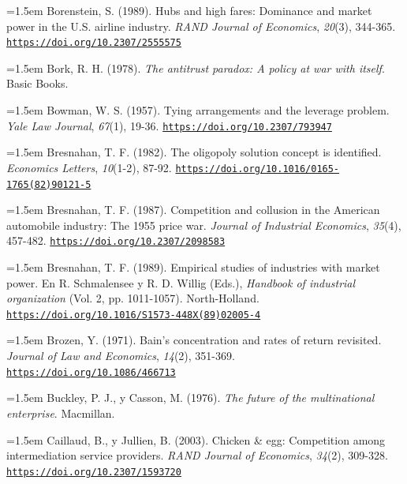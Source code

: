 \documentclass[10pt,a4paper]{article}
\begin{document}
\noindent\hangindent=1.5em Borenstein, S. (1989). Hubs and high fares: Dominance and market power in the U.S. airline industry. \textit{RAND Journal of Economics}, \textit{20}(3), 344-365. \href{https://doi.org/10.2307/2555575}{\nolinkurl{https://doi.org/10.2307/2555575}}

\noindent\hangindent=1.5em Bork, R. H. (1978). \textit{The antitrust paradox: A policy at war with itself}. Basic Books.

\noindent\hangindent=1.5em Bowman, W. S. (1957). Tying arrangements and the leverage problem. \textit{Yale Law Journal}, \textit{67}(1), 19-36. \href{https://doi.org/10.2307/793947}{\nolinkurl{https://doi.org/10.2307/793947}}

\noindent\hangindent=1.5em Bresnahan, T. F. (1982). The oligopoly solution concept is identified. \textit{Economics Letters}, \textit{10}(1-2), 87-92. \href{https://doi.org/10.1016/0165-1765(82)90121-5}{\nolinkurl{https://doi.org/10.1016/0165-1765(82)90121-5}}

\noindent\hangindent=1.5em Bresnahan, T. F. (1987). Competition and collusion in the American automobile industry: The 1955 price war. \textit{Journal of Industrial Economics}, \textit{35}(4), 457-482. \href{https://doi.org/10.2307/2098583}{\nolinkurl{https://doi.org/10.2307/2098583}}

\noindent\hangindent=1.5em Bresnahan, T. F. (1989). Empirical studies of industries with market power. En R. Schmalensee y R. D. Willig (Eds.), \textit{Handbook of industrial organization} (Vol. 2, pp. 1011-1057). North-Holland. \href{https://doi.org/10.1016/S1573-448X(89)02005-4}{\nolinkurl{https://doi.org/10.1016/S1573-448X(89)02005-4}}

\noindent\hangindent=1.5em Brozen, Y. (1971). Bain's concentration and rates of return revisited. \textit{Journal of Law and Economics}, \textit{14}(2), 351-369. \href{https://doi.org/10.1086/466713}{\nolinkurl{https://doi.org/10.1086/466713}}

\noindent\hangindent=1.5em Buckley, P. J., y Casson, M. (1976). \textit{The future of the multinational enterprise}. Macmillan.

\noindent\hangindent=1.5em Caillaud, B., y Jullien, B. (2003). Chicken \& egg: Competition among intermediation service providers. \textit{RAND Journal of Economics}, \textit{34}(2), 309-328. \href{https://doi.org/10.2307/1593720}{\nolinkurl{https://doi.org/10.2307/1593720}}
\end{document}
